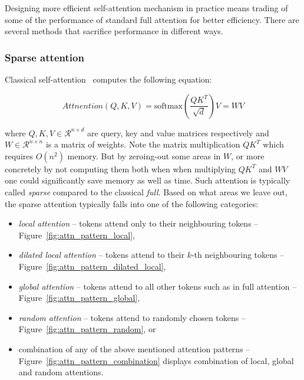 Designing more efficient self-attention mechanism in practice means trading of
some of the performance of standard full attention for better efficiency. There
are several methods that sacrifice performance in different ways.

\subsubsection{Sparse attention}

Classical self-attention~\cite{vaswani2017attention} computes the following
equation:

\begin{equation}
    Attnention(Q, K, V) = \text{softmax}(\frac{QK^T}{\sqrt d}) V = WV
\end{equation}

where $Q, K, V \in \mathcal{R}^{n\times d}$ are query, key and value matrices
respectively and $W \in \mathcal{R}^{n\times n}$ is a matrix of weights. Note
the matrix multiplication $QK^T$ which requires $O(n^2)$ memory. But by
zeroing-out some areas in $W$, or more concretely by not computing them both
when when multiplying $QK^T$ and $WV$ one could significantly save memory as
well as time. Such attention is typically called \emph{sparse} compared to the
classical \emph{full}. Based on what areas we leave out, the sparse attention
typically falls into one of the following categories:

\begin{itemize}

    \item \emph{local attention} -- tokens attend only to their neighbouring tokens --
        Figure~\ref{fig:attn_pattern_local},

    \item \emph{dilated local attention} -- tokens attend to their $k$-th neighbouring
        tokens -- Figure~\ref{fig:attn_pattern_dilated_local},

    \item \emph{global attention} -- tokens attend to all other tokens such as in full
        attention -- Figure~\ref{fig:attn_pattern_global},

    \item \emph{random attention} -- tokens attend to randomly chosen tokens --
        Figure~\ref{fig:attn_pattern_random}, or

    \item combination of any of the above mentioned attention patterns --
        Figure~\ref{fig:attn_pattern_combination} displays combination of
        local, global and random attentions.

\end{itemize}

